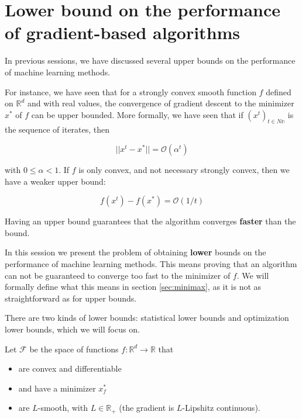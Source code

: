 \documentclass[
10pt, %
a4paper, %
oneside, %
headinclude,footinclude, %
BCOR5mm, %
]{scrartcl}
\title{\normalfont{FTML practical session 14}}
\author{\spacedlowsmallcaps{}
}
\date{\today}
\begin{document}
\renewcommand{\sectionmark}[1]{\markright{\spacedlowsmallcaps{#1}}}
\lehead{\mbox{\llap{\small\thepage\kern1em\color{halfgray} \vline}\color{halfgray}\hspace{0.5em}\rightmark\hfil}} 
\pagestyle{scrheadings}
\maketitle 
\setcounter{tocdepth}{3} 

\tableofcontents

\section{\large\color{Blue}Lower bound on the performance of gradient-based algorithms}

In previous sessions, we have discussed several upper bounds on the performance
of machine learning methods. 

For instance, we have seen that for a strongly
convex smooth function $f$ defined on $ \mathbb{R}^d$ and with real values,
the convergence of gradient descent to the minimizer $x^*$ of
$f$ can be upper bounded. More formally, we have seen that if
$(x^t)_{t\in N\mathbb{n} }$ is the sequence of iterates, then

\begin{equation}
    ||x^t-x^*|| = \mathcal{O}(\alpha^t) 
\end{equation}

with $0\leq \alpha<1$. If $f$ is only convex, and not necessary strongly
convex, then we have a weaker upper bound:

\begin{equation}
    f(x^t)-f(x^*) = \mathcal{O} ( 1/t)
\end{equation}

Having an upper bound guarantees that the algorithm converges \textbf{{faster}}
than the bound.

In this session we present the problem of obtaining \textbf{{lower}} bounds on the
performance of machine learning methods. This means proving that an algorithm
can not be guaranteed to converge too fast to the minimizer of $f$. We will
formally define what this means in section \ref{sec:minimax}, as it is not as straightforward as for upper
bounds.

There are two kinds of lower bounds: statistical lower bounds and optimization lower bounds, which we will focus on.


Let $ \mathcal{F} $ be the space of functions $f: \mathbb{R}^d \rightarrow \mathbb{R} $ that
\begin{itemize}
    \item are convex and differentiable
    \item and have a minimizer $x_f^*$
    \item are $L$-smooth, with $L\in \mathbb{R}_+$ (the gradient is $L$-Lipshitz continuous).
\end{itemize}
\end{document}
